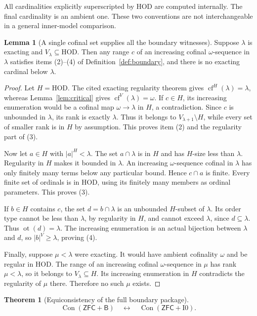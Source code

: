 \documentclass[11pt,letterpaper]{article}
\theoremstyle{definition}
\newtheorem{theorem}[definition]{Theorem}
\newtheorem{lemma}[definition]{Lemma}
\newcommand{\ZFC}{\mathsf{ZFC}}
\newcommand{\HOD}{\mathrm{HOD}}
\newcommand{\Con}{\operatorname{Con}}
\newcommand{\cf}{\operatorname{cf}}
\newcommand{\ot}{\operatorname{ot}}
\newcommand{\Izero}{\mathrm{I0}}
\newcommand{\Bdry}{\mathsf{B}}
\begin{document}
All cardinalities explicitly superscripted by HOD are computed internally.
The final cardinality is an ambient one. These two conventions are not
interchangeable in a general inner-model comparison.

\begin{lemma}[A single cofinal set supplies all the boundary witnesses]
\label{lem:boundary}
Suppose $\lambda$ is exacting and $V_\lambda\subseteq\HOD$. Then any range $c$
of an increasing cofinal $\omega$-sequence in $\lambda$ satisfies items
(2)--(4) of Definition~\ref{def:boundary}, and there is no exacting cardinal
below $\lambda$.
\end{lemma}

\begin{proof}
Let $H=\HOD$. The cited exacting regularity theorem gives
$\cf^H(\lambda)=\lambda$, whereas Lemma~\ref{lem:critical} gives
$\cf^V(\lambda)=\omega$.
If $c\in H$, its increasing enumeration would be a cofinal map
$\omega\to\lambda$ in $H$, a contradiction. Since $c$ is unbounded in
$\lambda$, its rank is exactly $\lambda$. Thus it belongs to
$V_{\lambda+1}\setminus H$, while every set of smaller rank is in $H$ by
assumption. This proves item (2) and the regularity part of (3).

Now let $a\in H$ with $|a|^H<\lambda$. The set $a\cap\lambda$ is in $H$ and
has $H$-size less than $\lambda$. Regularity in $H$ makes it bounded in
$\lambda$. An increasing $\omega$-sequence cofinal in $\lambda$ has only
finitely many terms below any particular bound. Hence $c\cap a$ is finite.
Every finite set of ordinals is in HOD, using its finitely many members as
ordinal parameters. This proves (3).

If $b\in H$ contains $c$, the set $d=b\cap\lambda$ is an unbounded
$H$-subset of $\lambda$. Its order type cannot be less than $\lambda$, by
regularity in $H$, and cannot exceed $\lambda$, since $d\subseteq\lambda$.
Thus $\ot(d)=\lambda$. The increasing enumeration is an actual bijection
between $\lambda$ and $d$, so $|b|^V\geq\lambda$, proving (4).

Finally, suppose $\mu<\lambda$ were exacting. It would have ambient
cofinality $\omega$ and be regular in HOD. The range of an increasing cofinal
$\omega$-sequence in $\mu$ has rank $\mu<\lambda$, so it belongs to
$V_\lambda\subseteq H$. Its increasing enumeration in $H$ contradicts the
regularity of $\mu$ there. Therefore no such $\mu$ exists.
\end{proof}

\begin{theorem}[Equiconsistency of the full boundary package]\label{thm:eq}
\[
 \Con(\ZFC+\Bdry)\quad\longleftrightarrow\quad\Con(\ZFC+\Izero).
\]
\end{theorem}
\end{document}
